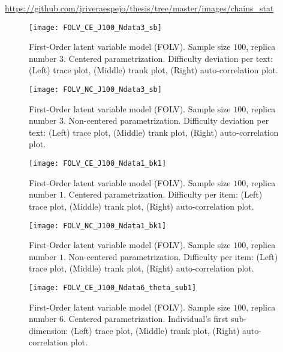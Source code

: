 \noindent \url{https://github.com/jriveraespejo/thesis/tree/master/images/chains_stat}
%
\begin{figure}[H]
	\centering
	\texttt{[image: FOLV\_CE\_J100\_Ndata3\_sb]}
	\caption[First-Order latent variable model (FOLV). Sample size $100$, replica number $3$. Centered parametrization. Difficulty deviation per text. Trace, trank and auto-correlation plots.]%
	{First-Order latent variable model (FOLV). Sample size $100$, replica number $3$. Centered parametrization. Difficulty deviation per text: (Left) trace plot, (Middle) trank plot, (Right) auto-correlation plot.}
	\label{fig:FOLV_CE_chains2}
\end{figure}
%
\begin{figure}[H]
	\centering
	\texttt{[image: FOLV\_NC\_J100\_Ndata3\_sb]}
	\caption[First-Order latent variable model (FOLV). Sample size $100$, replica number $3$. Non-centered parametrization. Difficulty deviation per text. Trace, trank and auto-correlation plots.]%
	{First-Order latent variable model (FOLV). Sample size $100$, replica number $3$. Non-centered parametrization. Difficulty deviation per text: (Left) trace plot, (Middle) trank plot, (Right) auto-correlation plot.}
	\label{fig:FOLV_NC_chains2}
\end{figure}
%
\begin{figure}[H]
	\centering
	\texttt{[image: FOLV\_CE\_J100\_Ndata1\_bk1]}
	\caption[First-Order latent variable model (FOLV). Sample size $100$, replica number $1$. Centered parametrization. Difficulty per item. Trace, trank and auto-correlation plots.]%
	{First-Order latent variable model (FOLV). Sample size $100$, replica number $1$. Centered parametrization. Difficulty per item: (Left) trace plot, (Middle) trank plot, (Right) auto-correlation plot.}
	\label{fig:FOLV_CE_chains3}
\end{figure}
%
\begin{figure}[H]
	\centering
	\texttt{[image: FOLV\_NC\_J100\_Ndata1\_bk1]}
	\caption[First-Order latent variable model (FOLV). Sample size $100$, replica number $1$. Non-centered parametrization. Difficulty per item. Trace, trank and auto-correlation plots.]%
	{First-Order latent variable model (FOLV). Sample size $100$, replica number $1$. Non-centered parametrization. Difficulty per item: (Left) trace plot, (Middle) trank plot, (Right) auto-correlation plot.}
	\label{fig:FOLV_NC_chains3}
\end{figure}
%
\begin{figure}[H]
	\centering
	\texttt{[image: FOLV\_CE\_J100\_Ndata6\_theta\_sub1]}
	\caption[First-Order latent variable model (FOLV). Sample size $100$, replica number $6$. Centered parametrization. Individual's first sub-dimension. Trace, trank and auto-correlation plots.]%
	{First-Order latent variable model (FOLV). Sample size $100$, replica number $6$. Centered parametrization. Individual's first sub-dimension: (Left) trace plot, (Middle) trank plot, (Right) auto-correlation plot.}
	\label{fig:FOLV_CE_chains4}
\end{figure}
